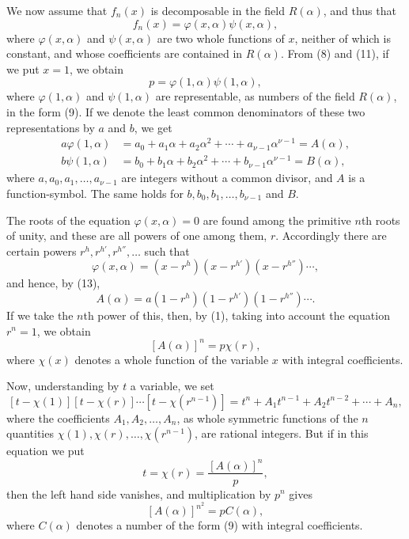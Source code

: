 \documentclass[11pt]{article}
\begin{document}
We now assume that $f_n(x)$ is decomposable in the field $R(\alpha)$, and thus that
\begin{equation}\tag{11}
f_n(x)=\varphi(x,\alpha)\psi(x,\alpha),
\end{equation}
where $\varphi(x,\alpha)$ and $\psi(x,\alpha)$ are two whole functions of $x$, neither of which is constant, and whose coefficients are contained in $R(\alpha)$. From (8) and (11), if we put $x=1$, we obtain
\begin{equation}\tag{12}
p=\varphi(1,\alpha)\psi(1,\alpha),
\end{equation}
where $\varphi(1,\alpha)$ and $\psi(1,\alpha)$ are representable, as numbers of the field $R(\alpha)$, in the form (9). If we denote the least common denominators of these two representations by $a$ and $b$, we get
\begin{equation}\tag{13}
\begin{aligned}
a\varphi(1,\alpha)&=a_0+a_1\alpha+a_2\alpha^2+\cdots+a_{\nu-1}\alpha^{\nu-1}=A(\alpha),\\
b\psi(1,\alpha)&=b_0+b_1\alpha+b_2\alpha^2+\cdots+b_{\nu-1}\alpha^{\nu-1}=B(\alpha),
\end{aligned}
\end{equation}
where $a,a_0,a_1,\ldots,a_{\nu-1}$ are integers without a common divisor, and $A$ is a function-symbol. The same holds for $b,b_0,b_1,\ldots,b_{\nu-1}$ and $B$.

The roots of the equation $\varphi(x,\alpha)=0$ are found among the primitive $n$th roots of unity, and these are all powers of one among them, $r$. Accordingly there are certain powers $r^h,r^{h'},r^{h''},\ldots$ such that
\[
\varphi(x,\alpha)=(x-r^h)(x-r^{h'})(x-r^{h''})\cdots,
\]
and hence, by (13),
\[
A(\alpha)=a(1-r^h)(1-r^{h'})(1-r^{h''})\cdots .
\]
If we take the $n$th power of this, then, by (1), taking into account the equation $r^n=1$, we obtain
\[
[A(\alpha)]^n=p\chi(r),
\]
where $\chi(x)$ denotes a whole function of the variable $x$ with integral coefficients.

Now, understanding by $t$ a variable, we set
\[
[t-\chi(1)][t-\chi(r)]\cdots[t-\chi(r^{n-1})]
=t^n+A_1t^{n-1}+A_2t^{n-2}+\cdots+A_n,
\]
where the coefficients $A_1,A_2,\ldots,A_n$, as whole symmetric functions of the $n$ quantities $\chi(1),\chi(r),\ldots,\chi(r^{n-1})$, are rational integers. But if in this equation we put
\[
t=\chi(r)=\frac{[A(\alpha)]^n}{p},
\]
then the left hand side vanishes, and multiplication by $p^n$ gives
\begin{equation}\tag{14}
[A(\alpha)]^{n^2}=pC(\alpha),
\end{equation}
where $C(\alpha)$ denotes a number of the form (9) with integral coefficients.
\end{document}

